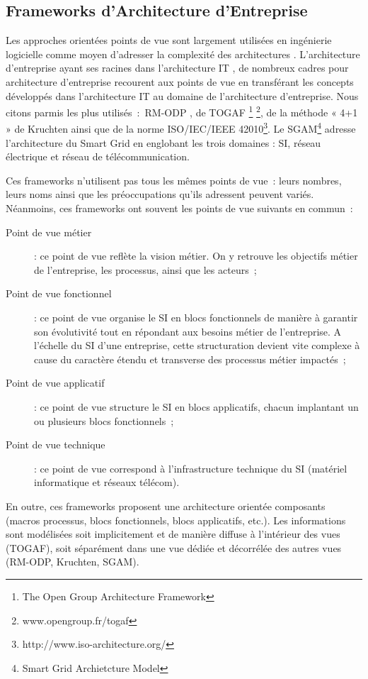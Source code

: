 	\subsection{Frameworks d'Architecture d'Entreprise}

Les approches orientées points de vue sont largement utilisées en ingénierie logicielle comme moyen d'adresser la complexité des architectures \cite{steen2004supporting}. L'architecture d'entreprise ayant ses racines dans l'architecture IT \cite{winter2008enterprise}, de nombreux cadres pour architecture d'entreprise 
recourent aux points de vue en transférant les concepts développés dans 
l'architecture IT au domaine de l'architecture d'entreprise. Nous citons parmis les plus utilisés~:~RM-ODP \cite{raymond1995reference}, de TOGAF \footnote{The Open Group Architecture Framework} \footnote{www.opengroup.fr/togaf}, de la méthode « 4+1 » de Kruchten \cite{kruchten19954+} ainsi que de la norme ISO/IEC/IEEE 42010\footnote{http://www.iso-architecture.org/}. Le SGAM\footnote{Smart Grid Archietcture Model} \cite{uslar2012standardization} adresse l'architecture du Smart Grid en englobant les trois domaines : SI, réseau électrique et réseau de télécommunication. 

Ces frameworks n'utilisent pas tous les mêmes points de vue~: leurs nombres, leurs noms 
ainsi que les préoccupations qu'ils adressent peuvent variés. Néanmoins, ces 
frameworks ont souvent les points de vue suivants en commun~:
\begin{description}
\item[Point de vue métier]  : ce point de vue reflète la vision métier. On y retrouve les objectifs métier de l'entreprise, les processus, ainsi que les acteurs~;
\item[Point de vue fonctionnel] : ce point de vue organise le SI en blocs fonctionnels de manière à garantir son évolutivité tout en répondant aux besoins métier de l'entreprise. A l'échelle du SI d'une entreprise, cette structuration devient vite complexe à cause du caractère étendu et transverse des processus métier impactés~;
\item[Point de vue applicatif] : ce point de vue structure le SI en blocs applicatifs, chacun implantant un ou plusieurs blocs fonctionnels~;
\item[Point de vue technique] : ce point de vue correspond à l'infrastructure technique du SI (matériel informatique et réseaux télécom).
\end{description}

En outre, ces frameworks proposent une architecture orientée composants (macros processus, blocs fonctionnels, blocs applicatifs, etc.). Les informations sont modélisées soit implicitement et de manière diffuse à l'intérieur des vues (TOGAF), soit séparément dans une vue dédiée et décorrélée des autres vues (RM-ODP, Kruchten, SGAM).

